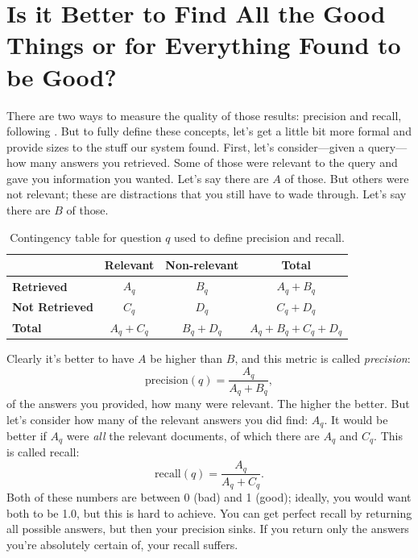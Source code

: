 \section{Is it Better to Find All the Good Things or for Everything Found to be Good?}
\label{sec:ir:precision-recall}

There are two ways to measure the quality of those results: precision and
recall, following \citet{keen-66}.
%
But to fully define these concepts, let's get a little bit more formal
and provide sizes to the stuff our system found.
%
First, let's consider---given a query---how many answers you
retrieved.
%
Some of those were relevant to the query and gave you information you
wanted.
%
Let's say there are $A$ of those.
%
But others were not
relevant; these are distractions that you still have to wade
through.
%
Let's say there are $B$ of those.

\begin{table}
\centering
\begin{tabular}{lccc}
\toprule
 & \textbf{Relevant} & \textbf{Non-relevant} & \textbf{Total} \\
\midrule
\textbf{Retrieved}
    & $A_q$
    & $B_q$
    & $A_q + B_q$ \\
\textbf{Not Retrieved}
    & $C_q$
    & $D_q$
    & $C_q + D_q$ \\
\midrule
\textbf{Total}
    & $A_q + C_q$
    & $B_q + D_q$
    & $A_q + B_q + C_q + D_q$ \\
\bottomrule
\end{tabular}
\caption{Contingency table for question $q$ used to define precision
  and recall.}
\end{table}

Clearly it's better to have $A$ be higher than $B$, and this metric is
called \emph{precision}:
\begin{equation}
  \mbox{precision}(q) = \frac{A_q}{A_q + B_q},
\end{equation}
of the answers you provided, how many were relevant.  The higher the
better.
%
But let's consider how many of the relevant answers you did find:
$A_q$.  It would be better if $A_q$ were \emph{all} the relevant
documents, of which there are $A_q$ and $C_q$.
%
This is called recall:
\begin{equation}
  \mbox{recall}(q) = \frac{A_q}{A_q + C_q}.
\end{equation}
Both of these numbers are between 0 (bad) and 1 (good); ideally, you
would want both to be 1.0, but this is hard to achieve.
%
You can get perfect recall by returning all possible answers, but then
your precision sinks.
%
If you return only the answers you're absolutely certain of, your
recall suffers.

